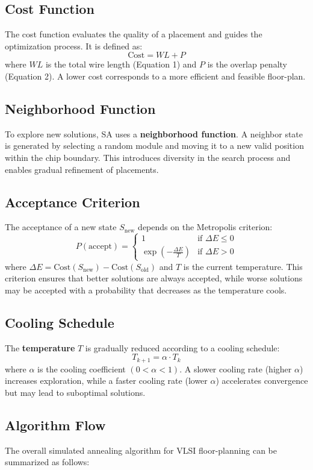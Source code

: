 \documentclass[9pt,a4paper,twoside]{rho-class/rho}
\begin{document}
\subsection{Cost Function}
The cost function evaluates the quality of a placement and guides the optimization process. It is defined as:
\[
\text{Cost} = WL + P
\]
where $WL$ is the total wire length (Equation 1) and $P$ is the overlap penalty (Equation 2). A lower cost corresponds to a more efficient and feasible floor-plan.

\subsection{Neighborhood Function}
To explore new solutions, SA uses a \textbf{neighborhood function}. A neighbor state is generated by selecting a random module and moving it to a new valid position within the chip boundary. This introduces diversity in the search process and enables gradual refinement of placements.

\subsection{Acceptance Criterion}
The acceptance of a new state $S_{\text{new}}$ depends on the Metropolis criterion:
\[
P(\text{accept}) =
\begin{cases} 
1 & \text{if } \Delta E \leq 0 \\
\exp\left(-\frac{\Delta E}{T}\right) & \text{if } \Delta E > 0
\end{cases}
\]
where $\Delta E = \text{Cost}(S_{\text{new}}) - \text{Cost}(S_{\text{old}})$ and $T$ is the current temperature. This criterion ensures that better solutions are always accepted, while worse solutions may be accepted with a probability that decreases as the temperature cools.

\subsection{Cooling Schedule}
The \textbf{temperature} $T$ is gradually reduced according to a cooling schedule:
\[
T_{k+1} = \alpha \cdot T_k
\]
where $\alpha$ is the cooling coefficient $(0 < \alpha < 1)$. A slower cooling rate (higher $\alpha$) increases exploration, while a faster cooling rate (lower $\alpha$) accelerates convergence but may lead to suboptimal solutions.

\subsection{Algorithm Flow}
The overall simulated annealing algorithm for VLSI floor-planning can be summarized as follows:
\end{document}
